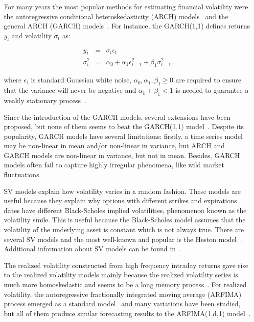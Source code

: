 For many years the most popular methods for estimating financial
volatility were the autoregressive conditional heteroskedasticity
(ARCH) models~\cite{engle1982} and the general ARCH (GARCH)
models~\cite{bollerslev1986}. For instance, the GARCH(1,1) defines
returns $y_t$ and volatility $\sigma_t$ as:

\begin{eqnarray*}
    y_t &=& \sigma_t \epsilon_t \\
     \sigma_t^2 &=& \alpha_0 + \alpha_1 \epsilon_{t-1}^2 + \beta_1
     \sigma_{t-1}^2
\end{eqnarray*}

\noindent where $\epsilon_t$ is standard Gaussian white noise,
$\alpha_0,\alpha_1,\beta_1 \geq 0$ are required to ensure that the
variance will never be negative and $\alpha_1+\beta_1 <1$ is needed to
guarantee a weakly stationary process~\cite{nelson1990}.

Since the introduction of the GARCH models, several extensions have been
proposed, but none of them seems to beat the GARCH(1,1)
model~\cite{lunde+hansen2005}. Despite its popularity, GARCH models have
several limitations: firstly, a time series model may be non-linear in mean
and/or non-linear in variance, but ARCH and GARCH models are non-linear in
variance, but not in mean. Besides, GARCH models often fail to capture highly
irregular phenomena, like wild market fluctuations.  

SV models explain how volatility varies in a random fashion. These models are
useful because they explain why options with different strikes and expirations
dates have different Black-Scholes implied volatilities, phenomenon known as
the volatility smile. This is useful because the Black-Scholes model assumes
that the volatility of the underlying asset is constant which is not always
true. There are several SV models and the most well-known and popular is the
Heston model~\cite{heston1993}. Additional information about SV models can be
found in~\cite{shephard1995}. 

The realized volatility constructed from high frequency intraday returns gave
rise to the realized volatility models mainly because the realized volatility
series is much more homoskedastic and seems to be a long memory
process~\cite{andersonetal2003}. For realized volatility, the autoregressive
fractionally integrated moving average (ARFIMA) process emerged as a standard
model~\cite{chenetal2010} and many variations have been studied, but all of
them produce similar forecasting results to the ARFIMA(1,d,1)
model~\cite{koopmanetal2005}.  

